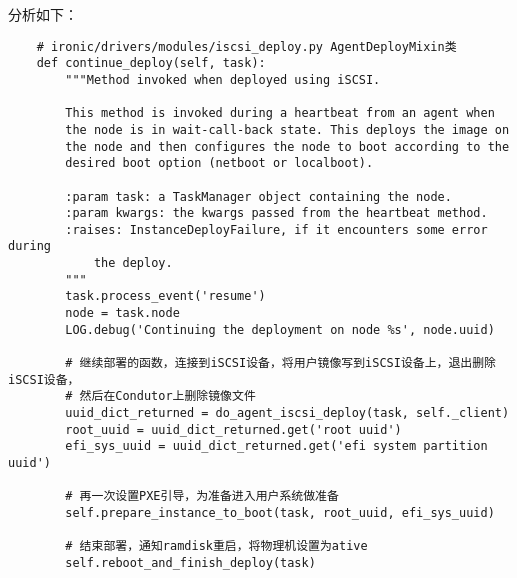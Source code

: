 \documentclass[a4paper,left=2.5cm,right=2.5cm,11pt]{article}
\begin{document}
	分析如下：
	\begin{lstlisting}
	# ironic/drivers/modules/iscsi_deploy.py AgentDeployMixin类
	def continue_deploy(self, task):
        """Method invoked when deployed using iSCSI.

        This method is invoked during a heartbeat from an agent when
        the node is in wait-call-back state. This deploys the image on
        the node and then configures the node to boot according to the
        desired boot option (netboot or localboot).

        :param task: a TaskManager object containing the node.
        :param kwargs: the kwargs passed from the heartbeat method.
        :raises: InstanceDeployFailure, if it encounters some error during
            the deploy.
        """
        task.process_event('resume')
        node = task.node
        LOG.debug('Continuing the deployment on node %s', node.uuid)

		# 继续部署的函数，连接到iSCSI设备，将用户镜像写到iSCSI设备上，退出删除iSCSI设备，
        # 然后在Condutor上删除镜像文件
        uuid_dict_returned = do_agent_iscsi_deploy(task, self._client)
        root_uuid = uuid_dict_returned.get('root uuid')
        efi_sys_uuid = uuid_dict_returned.get('efi system partition uuid')

		# 再一次设置PXE引导，为准备进入用户系统做准备
        self.prepare_instance_to_boot(task, root_uuid, efi_sys_uuid)

		# 结束部署，通知ramdisk重启，将物理机设置为ative
        self.reboot_and_finish_deploy(task)
	\end{lstlisting}
\end{document}
